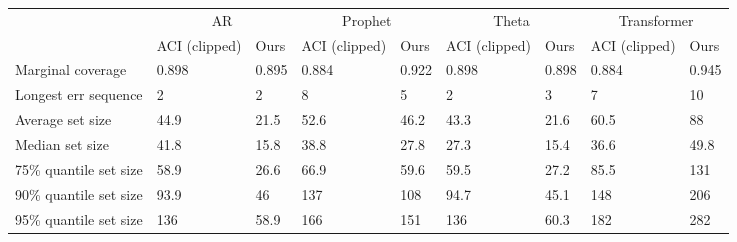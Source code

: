 \begin{tabular}{lllllllll}
\toprule
& \multicolumn{2}{c}{AR}& \multicolumn{2}{c}{Prophet}& \multicolumn{2}{c}{Theta}& \multicolumn{2}{c}{Transformer} \\
& ACI (clipped) & Ours & ACI (clipped) & Ours & ACI (clipped) & Ours & ACI (clipped) & Ours \\
\midrule
Marginal coverage & 0.898 & 0.895 & 0.884 & 0.922 & 0.898 & 0.898 & 0.884 & 0.945 \\
Longest err sequence & 2 & 2 & 8 & 5 & 2 & 3 & 7 & 10 \\
Average set size & 44.9 & 21.5 & 52.6 & 46.2 & 43.3 & 21.6 & 60.5 & 88 \\
Median set size & 41.8 & 15.8 & 38.8 & 27.8 & 27.3 & 15.4 & 36.6 & 49.8 \\
75\% quantile set size & 58.9 & 26.6 & 66.9 & 59.6 & 59.5 & 27.2 & 85.5 & 131 \\
90\% quantile set size & 93.9 & 46 & 137 & 108 & 94.7 & 45.1 & 148 & 206 \\
95\% quantile set size & 136 & 58.9 & 166 & 151 & 136 & 60.3 & 182 & 282 \\
\bottomrule
\end{tabular}
